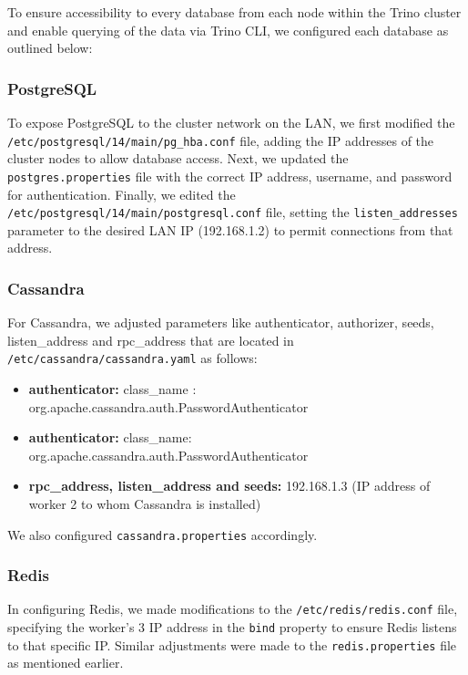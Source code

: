 \documentclass[conference]{IEEEtran}
\begin{document}
To ensure accessibility to every database from each node within the Trino cluster and enable querying of the data via Trino CLI, we configured each database as outlined below:

\subsubsection{PostgreSQL}

To expose PostgreSQL to the cluster network on the LAN, we first modified the \texttt{/etc/postgresql/14/main/pg\_hba.conf} file,
adding the IP addresses of the cluster nodes to allow database access. Next, we updated the \texttt{postgres.properties} file with the
correct IP address, username, and password for authentication. Finally, we edited the \texttt{/etc/postgresql/14/main/postgresql.conf}
file, setting the \texttt{listen\_addresses} parameter to the desired LAN IP (192.168.1.2) to permit connections from that address.
\subsubsection{Cassandra}

For Cassandra, we adjusted parameters like authenticator, authorizer, seeds, listen\_address and rpc\_address that are located in \texttt{/etc/cassandra/cassandra.yaml} as follows:

\begin{itemize}
    \item \textbf{authenticator:} class\_name : \\org.apache.cassandra.auth.PasswordAuthenticator
    \item \textbf{authenticator:}
          class\_name: \\org.apache.cassandra.auth.PasswordAuthenticator
    \item \textbf{rpc\_address, listen\_address and seeds:} 192.168.1.3 (IP address of worker 2 to whom Cassandra is installed)
\end{itemize}

We also configured \texttt{cassandra.properties} accordingly.

\subsubsection{Redis}


In configuring Redis, we made modifications to the \texttt{/etc/redis/redis.conf} file, specifying the worker's 3 IP address in the \texttt{bind} property
to ensure Redis listens to that specific IP. Similar adjustments were made to the \texttt{redis.properties} file as mentioned earlier.
\end{document}
